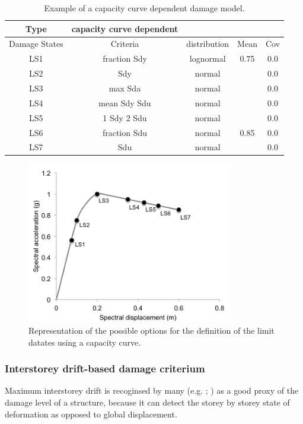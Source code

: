 \begin {table}[htb]
\caption{Example of a capacity curve dependent damage model.} 
\label{table:cc_dmg} 
\begin{center}
  \begin{tabular}{ | c | c | c | c | c |}
  \hline
    Type & capacity curve dependent &  &  & \\ \hline
    Damage States & Criteria & distribution & Mean & Cov \\ \hline
    LS1 & fraction Sdy & lognormal & 0.75 & 0.0 \\ \hline
    LS2 & Sdy & normal &  & 0.0 \\ \hline
    LS3 & max Sda & normal &  & 0.0 \\ \hline
    LS4 & mean Sdy Sdu & normal &  & 0.0 \\ \hline
    LS5 & 1 Sdy 2 Sdu & normal &  & 0.0 \\ \hline
    LS6 & fraction Sdu & normal & 0.85 & 0.0 \\ \hline
    LS7 & Sdu & normal &  & 0.0 \\ \hline
  \end{tabular}
\end{center}
\end{table}

\begin{figure}[htb]
  \centering
      \includegraphics[width=9cm]{Figures/cc_damage_model.png}
  \caption{Representation of the possible options for the definition of the limit datates using a capacity curve.}
  \label{fig:cc_damage_model}
\end{figure}

\subsubsection{Interstorey drift-based damage criterium}
Maximum interstorey drift is recoginsed by many (e.g. \cite{VamvatsikosCornell2005}; \cite{RossettoElnashai2005}) as a good proxy of the damage level of a structure, because it can detect the storey by storey state of deformation as opposed to global displacement. 


